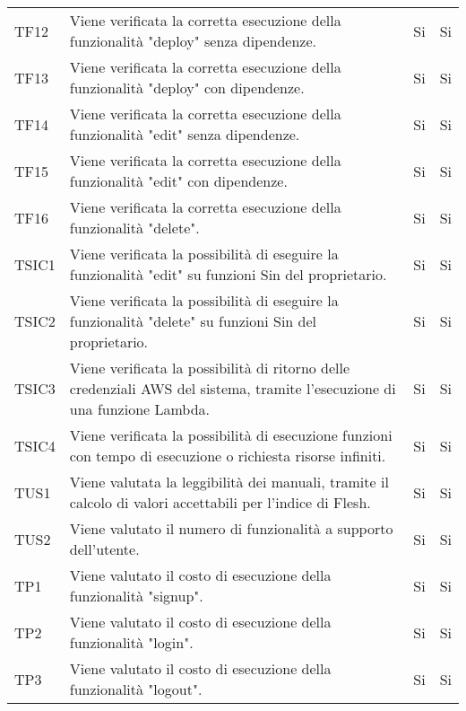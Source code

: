 \begin{longtable}{
		>{\centering}p{}
		>{}p{}
		>{\centering}p{}
		>{\centering}p{} }
		TF12 & Viene verificata la corretta esecuzione della funzionalità "deploy" senza dipendenze. &
		Si &
		Si \tabularnewline
		
		TF13 & Viene verificata la corretta esecuzione della funzionalità "deploy" con dipendenze. &
		Si &
		Si \tabularnewline
		
		TF14 & Viene verificata la corretta esecuzione della funzionalità "edit" senza dipendenze. &
		Si &
		Si \tabularnewline
		
		TF15 & Viene verificata la corretta esecuzione della funzionalità "edit" con dipendenze. &
		Si &
		Si \tabularnewline
		
		TF16 & Viene verificata la corretta esecuzione della funzionalità "delete". &
		Si &
		Si \tabularnewline
		
		
		
		
		TSIC1 & Viene verificata la possibilità di eseguire la funzionalità "edit" su funzioni Sin del proprietario. &
		Si &
		Si \tabularnewline
		
		TSIC2 & Viene verificata la possibilità di eseguire la funzionalità "delete" su funzioni Sin del proprietario. &
		Si &
		Si \tabularnewline
		
		TSIC3 & Viene verificata la possibilità di ritorno delle credenziali AWS\ped{\textit{G}} del sistema, tramite l'esecuzione di una funzione Lambda\ped{\textit{G}}. &
		Si &
		Si \tabularnewline
		
		TSIC4 & Viene verificata la possibilità di esecuzione funzioni con tempo di esecuzione o richiesta risorse infiniti.  &
		Si &
		Si \tabularnewline
		
		
		
		
		
		
		TUS1 & Viene valutata la leggibilità dei manuali, tramite il calcolo di valori accettabili per l'indice di Flesh. &
		Si &
		Si \tabularnewline
		
		TUS2 & Viene valutato il numero di funzionalità a supporto dell'utente. &
		Si &
		Si \tabularnewline




		TP1 & Viene valutato il costo di esecuzione della funzionalità "signup". &
		Si &
		Si \tabularnewline
		
		TP2 & Viene valutato il costo di esecuzione della funzionalità "login". &
		Si &
		Si \tabularnewline
		
		TP3 & Viene valutato il costo di esecuzione della funzionalità "logout". &
		Si &
		Si \tabularnewline
		

\end{longtable}
